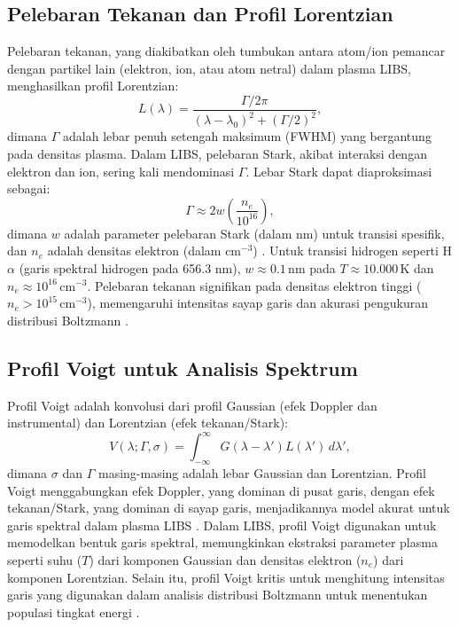 \subsection{Pelebaran Tekanan dan Profil Lorentzian}
Pelebaran tekanan, yang diakibatkan oleh tumbukan antara atom/ion pemancar dengan partikel lain (elektron, ion, atau atom netral) dalam plasma LIBS, menghasilkan profil Lorentzian:
\begin{equation}
L(\lambda) = \frac{\Gamma / 2\pi}{(\lambda - \lambda_0)^2 + (\Gamma / 2)^2}, \label{eq:lorentzian}
\end{equation}
dimana \( \Gamma \) adalah lebar penuh setengah maksimum (FWHM) yang bergantung pada densitas plasma. Dalam LIBS, pelebaran Stark, akibat interaksi dengan elektron dan ion, sering kali mendominasi \( \Gamma \). Lebar Stark dapat diaproksimasi sebagai:
\begin{equation}
\Gamma \approx 2w \left( \frac{n_e}{10^{16}} \right), \label{eq:stark_broadening}
\end{equation}
dimana \( w \) adalah parameter pelebaran Stark (dalam nm) untuk transisi spesifik, dan \( n_e \) adalah densitas elektron (dalam \( \text{cm}^{-3} \)) \citep{Griem1997,Konjevic1999}. Untuk transisi hidrogen seperti H\(\alpha\) (garis spektral hidrogen pada 656.3 nm), \( w \approx 0.1 \, \text{nm} \) pada \( T \approx 10.000 \, \text{K} \) dan \( n_e \approx 10^{16} \, \text{cm}^{-3} \). Pelebaran tekanan signifikan pada densitas elektron tinggi (\( n_e > 10^{15} \, \text{cm}^{-3} \)), memengaruhi intensitas sayap garis dan akurasi pengukuran distribusi Boltzmann \citep{Aragon2008}.

\subsection{Profil Voigt untuk Analisis Spektrum}
Profil Voigt adalah konvolusi dari profil Gaussian (efek Doppler dan instrumental) dan Lorentzian (efek tekanan/Stark):
\begin{equation}
V(\lambda; \Gamma, \sigma) = \int_{-\infty}^{\infty} G(\lambda - \lambda') L(\lambda') \, d\lambda', \label{eq:voigt}
\end{equation}
dimana \( \sigma \) dan \( \Gamma \) masing-masing adalah lebar Gaussian dan Lorentzian. Profil Voigt menggabungkan efek Doppler, yang dominan di pusat garis, dengan efek tekanan/Stark, yang dominan di sayap garis, menjadikannya model akurat untuk garis spektral dalam plasma LIBS \citep{Griem1997}. Dalam  LIBS, profil Voigt digunakan untuk memodelkan bentuk garis spektral, memungkinkan ekstraksi parameter plasma seperti suhu (\( T \)) dari komponen Gaussian dan densitas elektron (\( n_e \)) dari komponen Lorentzian. Selain itu, profil Voigt kritis untuk menghitung intensitas garis yang digunakan dalam analisis distribusi Boltzmann untuk menentukan populasi tingkat energi \citep{Miziolek2006,Aragon2008}.

